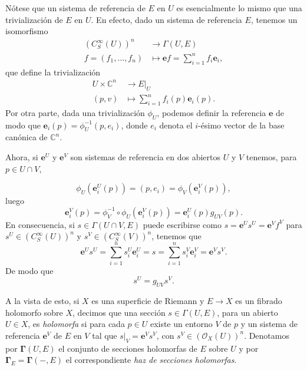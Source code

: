 \documentclass[12pt,a4paper]{article}
\theoremstyle{definition} \newtheorem{defn}[thm]{Definición}
\theoremstyle{definition} \newtheorem{ejemplo}[thm]{Ejemplo}
\theoremstyle{definition} \newtheorem{ejercicio}[thm]{Ejercicio}
\def\CC{\mathbb{C}}
\def\OO{\mathscr{O}}
\begin{document}
	      Nótese que un sistema de referencia de $E$ en $U$ es esencialmente lo mismo que una trivialización de $E$ en $U$. En efecto, dado un sistema de referencia $E$, tenemos un isomorfismo
	      \begin{align*}
		(C^\infty_S(U))^n &\longrightarrow \Gamma(U,E) \\ 
		f= (f_1,\dots,f_n)  &\longmapsto  \mathbf{e} f = \sum_{i=1}^n f_i \mathbf{e}_i,
		\end{align*}
		que define la trivialización 
		\begin{align*}
		   U \times \CC^n &\longrightarrow E|_U\\ 
		   (p,v) &\longmapsto \sum_{i=1}^n f_i(p) \mathbf{e}_i(p). 
		  \end{align*}
		  Por otra parte, dada una trivialización $\phi_U$, podemos definir la referencia $\mathbf{e}$ de modo que $\mathbf{e}_i(p) = \phi_U^{-1}(p,e_i)$, donde $e_i$ denota el $i$-ésimo vector de la base canónica de $\CC^n$.

		  Ahora, si $\mathbf{e}^U$ y $\mathbf{e}^V$ son sistemas de referencia en dos abiertos $U$ y $V$ tenemos, para $p\in U\cap V$,

		  \begin{equation*}
		    \phi_U(\mathbf{e}^U_i(p)) = (p,e_i) =\phi_V(\mathbf{e}^V_i(p)),
		  \end{equation*}
		  luego
		  \begin{equation*}
		    \mathbf{e}^V_i(p) = \phi_V^{-1} \circ \phi_U (\mathbf{e}^V_i(p)) =  \mathbf{e}^U_i(p) g_{UV}(p).
		  \end{equation*}
		  En consecuencia, si $s\in \Gamma(U\cap V,E)$ puede escribirse como $s=\mathbf{e}^U s^U = \mathbf{e}^V f^V$ para $s^U \in (C^\infty_S(U))^n$ y $s^V \in (C^\infty_S(V))^n$, tenemos que
	      \begin{equation*}
		\mathbf{e}^U s^U=	\sum_{i=1}^n s^U_i\mathbf{e}^U_i=s= \sum_{i=1}^n s^V_i \mathbf{e}^V_i = \mathbf{e}^V s^V.
	      \end{equation*}
	      De modo que
	      \begin{equation*}
		s^U=g_{UV} s^V.
	      \end{equation*}

	      A la vista de esto, si $X$ es una superficie de Riemann y $E\rightarrow X$ es un fibrado holomorfo sobre $X$, decimos que una sección $s \in \Gamma(U,E)$, para un abierto $U\in X$, es \emph{holomorfa} si para cada $p\in U$ existe un entorno $V$ de $p$ y un sistema de referencia $\mathbf{e}^V$ de $E$ en $V$ tal que $s|_V=\mathbf{e}^V s^V$, con $s^V\in (\OO_X(U))^n$. Denotamos por $\boldsymbol{\Gamma}(U,E)$ el conjunto de secciones holomorfas de $E$ sobre $U$ y por $\boldsymbol{\Gamma}_E = \boldsymbol{\Gamma}(-,E)$ el correspondiente \emph{haz de secciones holomorfas}.
\end{document}
